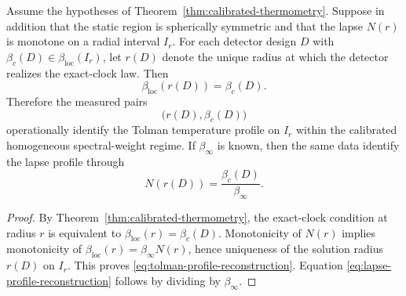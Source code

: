 \begin{corollary}\label{cor:tolman-reconstruction}
Assume the hypotheses of Theorem~\ref{thm:calibrated-thermometry}. Suppose in addition that the static region is spherically symmetric and that the lapse $N(r)$ is monotone on a radial interval $I_r$. For each detector design $D$ with $\beta_c(D)\in \beta_{\mathrm{loc}}(I_r)$, let $r(D)$ denote the unique radius at which the detector realizes the exact-clock law. Then
\begin{equation}\label{eq:tolman-profile-reconstruction}
\beta_{\mathrm{loc}}(r(D))=\beta_c(D).
\end{equation}
Therefore the measured pairs
\[
\bigl(r(D),\beta_c(D)\bigr)
\]
operationally identify the Tolman temperature profile on $I_r$ within the calibrated homogeneous spectral-weight regime. If $\beta_\infty$ is known, then the same data identify the lapse profile through
\begin{equation}\label{eq:lapse-profile-reconstruction}
N(r(D))=\frac{\beta_c(D)}{\beta_\infty}.
\end{equation}
\end{corollary}

\begin{proof}
By Theorem~\ref{thm:calibrated-thermometry}, the exact-clock condition at radius $r$ is equivalent to $\beta_{\mathrm{loc}}(r)=\beta_c(D)$. Monotonicity of $N(r)$ implies monotonicity of $\beta_{\mathrm{loc}}(r)=\beta_\infty N(r)$, hence uniqueness of the solution radius $r(D)$ on $I_r$. This proves \eqref{eq:tolman-profile-reconstruction}. Equation \eqref{eq:lapse-profile-reconstruction} follows by dividing by $\beta_\infty$.
\end{proof}

